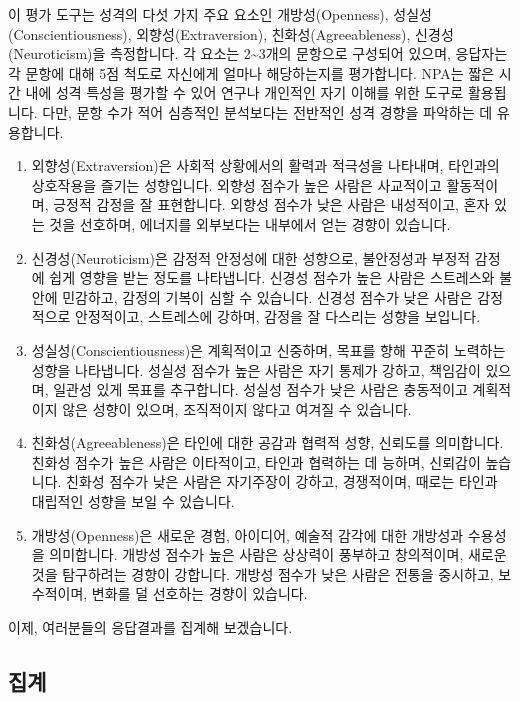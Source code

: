 \documentclass[
]{book}
\begin{document}
이 평가 도구는 성격의 다섯 가지 주요 요소인 개방성(Openness), 성실성(Conscientiousness), 외향성(Extraversion), 친화성(Agreeableness), 신경성(Neuroticism)을 측정합니다. 각 요소는 2\textasciitilde3개의 문항으로 구성되어 있으며, 응답자는 각 문항에 대해 5점 척도로 자신에게 얼마나 해당하는지를 평가합니다.
NPA는 짧은 시간 내에 성격 특성을 평가할 수 있어 연구나 개인적인 자기 이해를 위한 도구로 활용됩니다. 다만, 문항 수가 적어 심층적인 분석보다는 전반적인 성격 경향을 파악하는 데 유용합니다.

\begin{enumerate}
\def\labelenumi{\arabic{enumi}.}
\item
  외향성(Extraversion)은 사회적 상황에서의 활력과 적극성을 나타내며, 타인과의 상호작용을 즐기는 성향입니다. 외향성 점수가 높은 사람은 사교적이고 활동적이며, 긍정적 감정을 잘 표현합니다. 외향성 점수가 낮은 사람은 내성적이고, 혼자 있는 것을 선호하며, 에너지를 외부보다는 내부에서 얻는 경향이 있습니다.
\item
  신경성(Neuroticism)은 감정적 안정성에 대한 성향으로, 불안정성과 부정적 감정에 쉽게 영향을 받는 정도를 나타냅니다. 신경성 점수가 높은 사람은 스트레스와 불안에 민감하고, 감정의 기복이 심할 수 있습니다. 신경성 점수가 낮은 사람은 감정적으로 안정적이고, 스트레스에 강하며, 감정을 잘 다스리는 성향을 보입니다.
\item
  성실성(Conscientiousness)은 계획적이고 신중하며, 목표를 향해 꾸준히 노력하는 성향을 나타냅니다. 성실성 점수가 높은 사람은 자기 통제가 강하고, 책임감이 있으며, 일관성 있게 목표를 추구합니다. 성실성 점수가 낮은 사람은 충동적이고 계획적이지 않은 성향이 있으며, 조직적이지 않다고 여겨질 수 있습니다.
\item
  친화성(Agreeableness)은 타인에 대한 공감과 협력적 성향, 신뢰도를 의미합니다. 친화성 점수가 높은 사람은 이타적이고, 타인과 협력하는 데 능하며, 신뢰감이 높습니다. 친화성 점수가 낮은 사람은 자기주장이 강하고, 경쟁적이며, 때로는 타인과 대립적인 성향을 보일 수 있습니다.
\item
  개방성(Openness)은 새로운 경험, 아이디어, 예술적 감각에 대한 개방성과 수용성을 의미합니다. 개방성 점수가 높은 사람은 상상력이 풍부하고 창의적이며, 새로운 것을 탐구하려는 경향이 강합니다. 개방성 점수가 낮은 사람은 전통을 중시하고, 보수적이며, 변화를 덜 선호하는 경향이 있습니다.
\end{enumerate}

이제, 여러분들의 응답결과를 집계해 보겠습니다.

\subsection{집계}\label{uxc9d1uxacc4-54}
\end{document}
